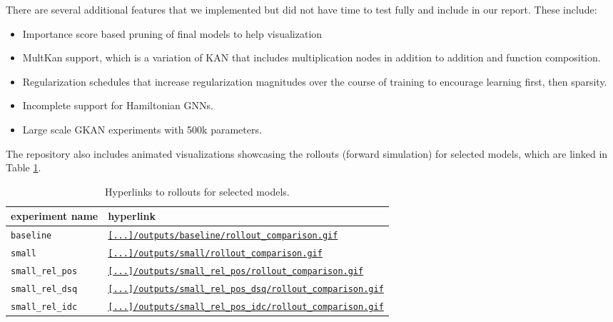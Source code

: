 \documentclass{article}
\begin{document}
There are several additional features that we implemented but did not have time to test fully and include in our report. These include:
\begin{itemize}
    \item Importance score based pruning of final models to help visualization
    \item MultKan support, which is a variation of KAN that includes multiplication nodes in addition to addition and function composition.
    \item Regularization schedules that increase regularization magnitudes over the course of training to encourage learning first, then sparsity.
    \item Incomplete support for Hamiltonian GNNs.
    \item Large scale GKAN experiments with 500k parameters. 
\end{itemize}

The repository also includes animated visualizations showcasing the rollouts (forward simulation) for selected models, which are linked in Table \ref{tab:rollout-links}.

\begin{table}[h]

\centering
\caption{Hyperlinks to rollouts for selected models.}
\begin{tabular}{l|l}
\hline
experiment name & hyperlink \\
\hline
\texttt{baseline} & \href{https://github.com/Hanson-Sun/3body-gkan/blob/main/outputs/baseline/rollout_comparison.gif}{\texttt{[...]/outputs/baseline/rollout\_comparison.gif}} \\
\texttt{small} & \href{https://github.com/Hanson-Sun/3body-gkan/blob/main/outputs/small/rollout_comparison.gif}{\texttt{[...]/outputs/small/rollout\_comparison.gif}} \\
\texttt{small\_rel\_pos} & \href{https://github.com/Hanson-Sun/3body-gkan/blob/main/outputs/small_rel_pos/rollout_comparison.gif}{\texttt{[...]/outputs/small\_rel\_pos/rollout\_comparison.gif}} \\
\texttt{small\_rel\_dsq} & \href{https://github.com/Hanson-Sun/3body-gkan/blob/main/outputs/small_rel_pos_dsq/rollout_comparison.gif}{\texttt{[...]/outputs/small\_rel\_pos\_dsq/rollout\_comparison.gif}} \\
\texttt{small\_rel\_idc} & \href{https://github.com/Hanson-Sun/3body-gkan/blob/main/outputs/small_rel_pos_idc/rollout_comparison.gif}{\texttt{[...]/outputs/small\_rel\_pos\_idc/rollout\_comparison.gif}} \\
\hline
\end{tabular}
\label{tab:rollout-links}

\end{table}
\end{document}
